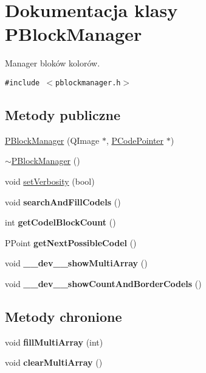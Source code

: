 \hypertarget{classPBlockManager}{
\section{Dokumentacja klasy PBlockManager}
\label{classPBlockManager}
}
Manager bloków kolorów.  


{\tt \#include $<$pblockmanager.h$>$}

\subsection*{Metody publiczne}
\begin{CompactItemize}
\item 
\hyperlink{classPBlockManager_f5a95fca85a31c0257b38b57cbb3378a}{PBlockManager} (QImage $\ast$, \hyperlink{classPCodePointer}{PCodePointer} $\ast$)
\item 
\hyperlink{classPBlockManager_52d7abb7f858625e9e014fb555f571a6}{$\sim$PBlockManager} ()
\item 
void \hyperlink{classPBlockManager_926e182e360300d6524fbb01fb90866b}{setVerbosity} (bool)
\item 
\hypertarget{classPBlockManager_88f9f5226179e0fbd9d148001de10e97}{
void \textbf{searchAndFillCodels} ()}
\label{classPBlockManager_88f9f5226179e0fbd9d148001de10e97}

\item 
\hypertarget{classPBlockManager_ba7919eedd6b806f2f4da408423723ea}{
int \textbf{getCodelBlockCount} ()}
\label{classPBlockManager_ba7919eedd6b806f2f4da408423723ea}

\item 
\hypertarget{classPBlockManager_667f3673eda6cf4476ecb34d01db665b}{
PPoint \textbf{getNextPossibleCodel} ()}
\label{classPBlockManager_667f3673eda6cf4476ecb34d01db665b}

\item 
\hypertarget{classPBlockManager_e6298891058bd316c07071db0c851b2f}{
void \textbf{\_\-\_\-dev\_\-\_\-showMultiArray} ()}
\label{classPBlockManager_e6298891058bd316c07071db0c851b2f}

\item 
\hypertarget{classPBlockManager_d0ed8ac41d59c34eb88aa30428961a82}{
void \textbf{\_\-\_\-dev\_\-\_\-showCountAndBorderCodels} ()}
\label{classPBlockManager_d0ed8ac41d59c34eb88aa30428961a82}

\end{CompactItemize}
\subsection*{Metody chronione}
\begin{CompactItemize}
\item 
\hypertarget{classPBlockManager_c31dc0993286be444a82ae5e51f32415}{
void \textbf{fillMultiArray} (int)}
\label{classPBlockManager_c31dc0993286be444a82ae5e51f32415}

\item 
\hypertarget{classPBlockManager_ab82616c7ee28fa12d4cfec944f550a0}{
void \textbf{clearMultiArray} ()}
\label{classPBlockManager_ab82616c7ee28fa12d4cfec944f550a0}

\end{CompactItemize}
